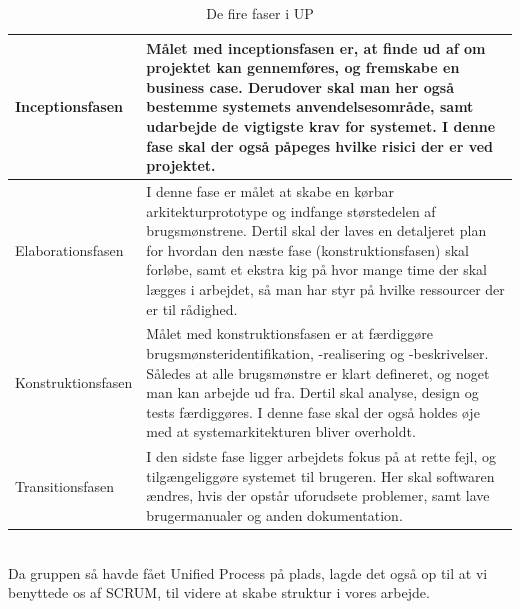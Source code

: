         \begin{table}[H]
        \centering
        \begin{tabular}{|p{35mm}|p{105mm}|}
        \hline
            Inceptionsfasen & Målet med inceptionsfasen er, at finde ud af om projektet kan gennemføres, og fremskabe en business case. Derudover skal man her også bestemme systemets anvendelsesområde, samt udarbejde de vigtigste krav for systemet. I denne fase skal der også påpeges hvilke risici der er ved projektet.
        \\ \hline
            Elaborationsfasen & I denne fase er målet at skabe en kørbar arkitekturprototype og indfange størstedelen af brugsmønstrene. Dertil skal der laves en detaljeret plan for hvordan den næste fase (konstruktionsfasen) skal forløbe, samt et ekstra kig på hvor mange time der skal lægges i arbejdet, så man har styr på hvilke ressourcer der er til rådighed.
        \\ \hline
            Konstruktionsfasen & Målet med konstruktionsfasen er at færdiggøre brugsmønsteridentifikation, -realisering og -beskrivelser. Således at alle brugsmønstre er klart defineret, og noget man kan arbejde ud fra. Dertil skal analyse, design og tests færdiggøres. I denne fase skal der også holdes øje med at systemarkitekturen bliver overholdt.
        \\ \hline
            Transitionsfasen & I den sidste fase ligger arbejdets fokus på at rette fejl, og tilgængeliggøre systemet til brugeren. Her skal softwaren ændres, hvis der opstår uforudsete problemer, samt lave brugermanualer og anden dokumentation.
        \\ \hline
        \end{tabular}
            \caption{De fire faser i UP}
            \label{tab:UP_faser}
        \end{table}
\\ Da gruppen så havde fået Unified Process på plads, lagde det også op til at vi benyttede os af SCRUM, til videre at skabe struktur i vores arbejde. %